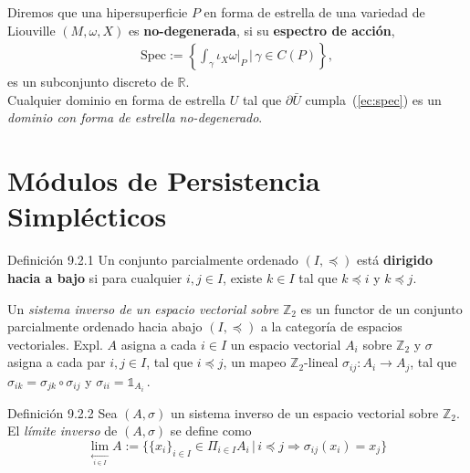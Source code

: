 \documentclass{beamer}
\begin{document}
\begin{frame}
Diremos que una hipersuperficie $P$ en forma de estrella de una variedad de Liouville $(M,\omega,X)$ es {\bfseries no-degenerada}, si su {\bfseries espectro de acci\'on},
\begin{gather}\mbox{Spec}:=\left\{ \int_{\gamma}\iota_{X}\omega|_P\,\big\vert\,\gamma\in C(P)\right\},\label{ec:spec}
\end{gather}
es un subconjunto discreto de $\mathbb{R}$.
$\,$\\$\,$\\
Cualquier dominio en forma de estrella $U$ tal que $\partial\bar{U}$ cumpla~(\ref{ec:spec}) es un \emph{dominio con forma de estrella no-degenerado}.
\end{frame}


\section{M\'odulos de Persistencia Simpl\'ecticos}
\begin{frame}
\begin{block}{Definici\'on 9.2.1}
Un conjunto parcialmente ordenado $(I,\preceq)$ est\'a {\bfseries dirigido hacia a bajo} si para cualquier $i,j\in I$, existe $k\in I$ tal que $k\preceq i$ y $k\preceq j$.
\end{block}
$\,$\\
Un \emph{sistema inverso de un espacio vectorial sobre} $\mathbb{Z}_2$ es un functor de un conjunto parcialmente ordenado hacia abajo $(I,\preceq)$ a la categor\'ia de espacios vectoriales. Expl. $A$ asigna a cada $i\in I$ un espacio vectorial $A_{i}$ sobre $\mathbb{Z}_{2}$ y $\sigma$ asigna a cada par $i,j\in I$, tal que $i\preceq j$, un mapeo $\mathbb{Z}_2$-lineal $\sigma_{ij}:A_{i}\rightarrow A_{j}$, tal que $\sigma_{ik}=\sigma_{jk}\circ\sigma_{ij}$ y $\sigma_{ii}=\mathbb{1}_{A_{i}}\,$.
\end{frame}

\begin{frame}
\begin{block}{Definici\'on 9.2.2}
Sea $(A,\sigma)$ un sistema inverso de un espacio vectorial sobre $\mathbb{Z}_2$. El \emph{l\'imite inverso} de $(A,\sigma)$ se define como
$$\lim_{  \xleftarrow[i\in I]{}} A:= \{ \{x_{i}\}_{i\in I}\in \Pi_{i\in I}A_{i} \,|\, i\preceq j \Rightarrow \sigma_{ij}(x_i)=x_{j}    \}$$
\end{block}
\end{frame}
\end{document}
